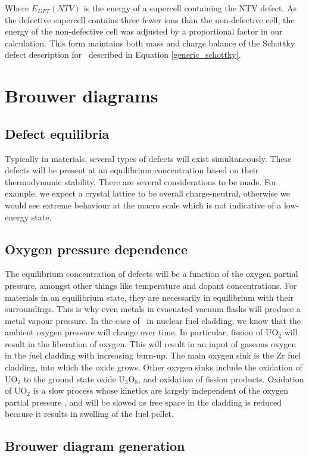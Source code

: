 Where $E_{DFT}(NTV)$ is the energy of a supercell containing the NTV defect. As the defective supercell contains three fewer ions than the non-defective cell, the energy of the non-defective cell was adjusted by a proportional factor in our calculation. This form maintains both mass and charge balance of the Schottky defect description for \zirconia\ described in Equation \ref{generic_schottky}.

\section{Brouwer diagrams}

\subsection{Defect equilibria}

Typically in materials, several types of defects will exist simultaneously. These defects will be present at an equilibrium concentration based on their thermodynamic stability. There are several considerations to be made. For example, we expect a crystal lattice to be overall charge-neutral, otherwise we would see extreme behaviour at the macro scale which is not indicative of a low-energy state.

\subsection{Oxygen pressure dependence}

The equilibrium concentration of defects will be a function of the oxygen partial pressure, amongst other things like temperature and dopant concentrations. For materials in an equilibrium state, they are necessarily in equilibrium with their surroundings. This is why even metals in evacuated vacuum flasks will produce a metal vapour pressure. In the case of \zirconia\ in nuclear fuel cladding, we know that the ambient oxygen pressure will change over time. In particular, fission of UO$_{2}$ will result in the liberation of oxygen. This will result in an input of gaseous oxygen in the fuel cladding with increasing burn-up. The main oxygen sink is the Zr fuel cladding, into which the oxide grows. Other oxygen sinks include the oxidation of UO$_{2}$ to the ground state oxide U$_{3}$O$_{8}$, and oxidation of fission products. Oxidation of UO$_{2}$ is a slow process whose kinetics are largely independent of the oxygen partial pressure \cite{Desgranges2009NeutronUO2}, and will be slowed as free space in the cladding is reduced because it results in swelling of the fuel pellet. 

\subsection{Brouwer diagram generation}